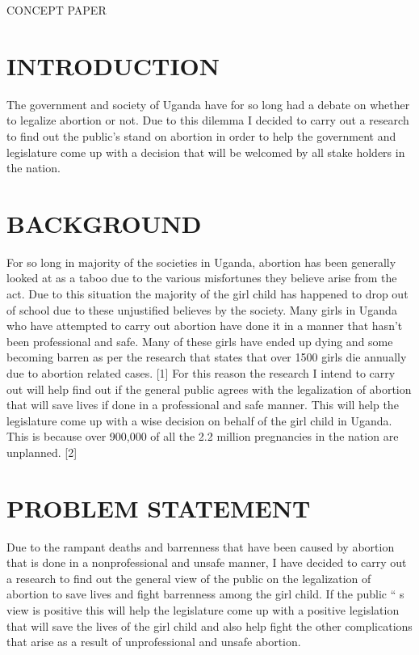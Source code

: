 \documentclass[12]{article}
\begin{document}
\begin{title}
\huge{CONCEPT PAPER }
\end{title}
\maketitle
\author{Emaru Emma	14/U/6225/eve	214016772}
\section{INTRODUCTION}

The government and society of Uganda have for so long had a debate on whether to legalize abortion or not. Due to this dilemma I decided to carry out a research to find out the public’s stand on abortion in order to help the government and legislature come up with a decision that will be welcomed by all stake holders in the nation.

\section{BACKGROUND}
For so long in majority of the societies in Uganda, abortion has been generally looked at as a taboo due to the various misfortunes they believe arise from the act. Due to this situation the majority of the girl child has happened to drop out of school due to these unjustified believes by the society. Many girls in Uganda who have attempted to carry out abortion have done it in a manner that hasn’t been professional and safe. Many of these girls have ended up dying and some becoming barren as per the research that states that over 1500 girls die annually due to abortion related cases. [1] For this reason the research I intend to carry out will help find out if the general public agrees with the legalization of abortion that will save lives if done in a professional and safe manner. This will help the legislature come up with a wise decision on behalf of the girl child in Uganda. This is because over 900,000 of all the 2.2 million pregnancies in the nation are unplanned. [2]

\section{PROBLEM STATEMENT}
Due to the rampant deaths and barrenness that have been caused by abortion that is done in a nonprofessional and unsafe manner, I have decided to carry out a research to find out the general view of the public on the legalization of abortion to save lives and fight barrenness among the girl child. If the public “ s view is positive this will help the legislature come up with a positive legislation that will save the lives of the girl child and also help fight the other complications that arise as a result of unprofessional and unsafe abortion.
\end{document}
